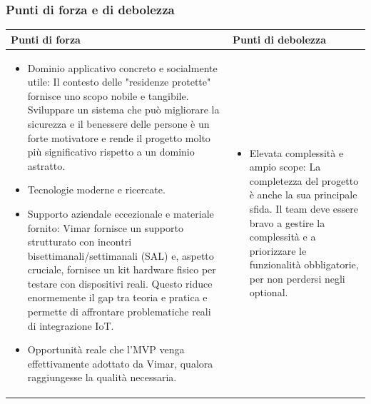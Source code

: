 \documentclass[a4paper,11pt]{article}
\begin{document}
\subsubsection{Punti di forza e di debolezza}
{\footnotesize
\begin{tabularx}{\textwidth}{|X|X|}
\hline
\rowcolor{lightgray!40} %
\textbf{Punti di forza} & \textbf{Punti di debolezza} \\
\hline
\begin{itemize}
\item Dominio applicativo concreto e socialmente utile: Il contesto delle "residenze protette" fornisce uno scopo nobile e tangibile. Sviluppare un sistema che può migliorare la sicurezza e il benessere delle persone è un forte motivatore e rende il progetto molto più significativo rispetto a un dominio astratto.
\item Tecnologie moderne e ricercate.
\item Supporto aziendale eccezionale e materiale fornito: Vimar fornisce un supporto strutturato con incontri bisettimanali/settimanali (SAL) e, aspetto cruciale, fornisce un kit hardware fisico per testare con dispositivi reali. Questo riduce enormemente il gap tra teoria e pratica e permette di affrontare problematiche reali di integrazione IoT.
\item Opportunità reale che l'MVP venga effettivamente adottato da Vimar, qualora raggiungesse la qualità necessaria.
\end{itemize}
 & \begin{itemize}
\item Elevata complessità e ampio scope: La completezza del progetto è anche la sua principale sfida. Il team deve essere bravo a gestire la complessità e a priorizzare le funzionalità obbligatorie, per non perdersi negli optional.
\end{itemize} \\
\hline
\end{tabularx}
}
\end{document}
